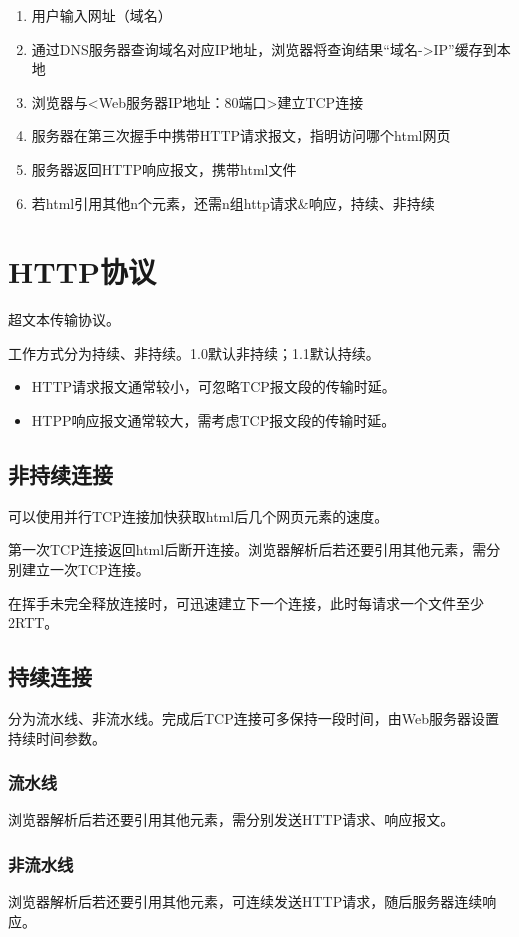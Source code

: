 \begin{enumerate}
    \item 用户输入网址（域名）
    \item 通过DNS服务器查询域名对应IP地址，浏览器将查询结果“域名->IP”缓存到本地
    \item 浏览器与<Web服务器IP地址：80端口>建立TCP连接
    \item 服务器在第三次握手中携带HTTP请求报文，指明访问哪个html网页
    \item 服务器返回HTTP响应报文，携带html文件
    \item 若html引用其他n个元素，还需n组http请求\&响应，持续、非持续
\end{enumerate}


\section{HTTP协议}
超文本传输协议。

工作方式分为持续、非持续。1.0默认非持续；1.1默认持续。
\begin{itemize}
    \item HTTP请求报文通常较小，可忽略TCP报文段的传输时延。
    \item HTPP响应报文通常较大，需考虑TCP报文段的传输时延。
\end{itemize}

\subsection{非持续连接}
可以使用并行TCP连接加快获取html后几个网页元素的速度。

第一次TCP连接返回html后断开连接。浏览器解析后若还要引用其他元素，需分别建立一次TCP连接。

在挥手未完全释放连接时，可迅速建立下一个连接，此时每请求一个文件至少2RTT。


\subsection{持续连接}
分为流水线、非流水线。完成后TCP连接可多保持一段时间，由Web服务器设置持续时间参数。

\subsubsection{流水线}
浏览器解析后若还要引用其他元素，需分别发送HTTP请求、响应报文。


\subsubsection{非流水线}
浏览器解析后若还要引用其他元素，可连续发送HTTP请求，随后服务器连续响应。


